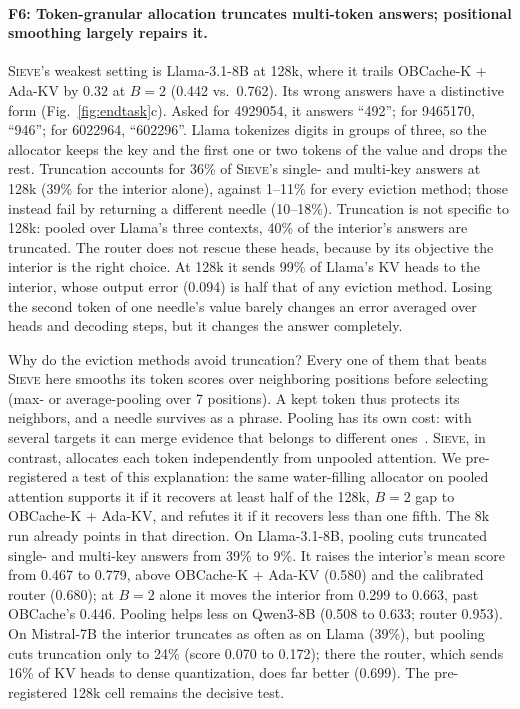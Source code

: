 \documentclass{article}
\newif\ifshowtbd \showtbdtrue
\newcommand{\tbd}[1]{\ifshowtbd{\color{tbdcol}\textbf{TBD}~#1}\else\ifhmode\unskip\fi\fi}
\newif\ifshowest \showesttrue
\DeclareRobustCommand{\est}[1]{\ifshowest{\color{estcol}#1}\else---\fi}
\DeclareRobustCommand{\estonly}[1]{\ifshowest#1\else\ifhmode\unskip\fi\fi}
\newcommand{\sieve}{\textsc{Sieve}}
\theoremstyle{definition}
\begin{document}
\paragraph{F6: Token-granular allocation truncates multi-token answers; positional smoothing largely repairs it.}
\sieve{}'s weakest setting is Llama-3.1-8B at 128k, where it trails OBCache-K + Ada-KV by $0.32$ at $B=2$ (0.442 vs.\ 0.762).  Its wrong answers have a distinctive form (Fig.~\ref{fig:endtask}c).  Asked for 4929054, it answers ``492''; for 9465170, ``946''; for 6022964, ``602296''.  Llama tokenizes digits in groups of three, so the allocator keeps the key and the first one or two tokens of the value and drops the rest.  Truncation accounts for 36\% of \sieve{}'s single- and multi-key answers at 128k (39\% for the interior alone), against 1--11\% for every eviction method; those instead fail by returning a different needle (10--18\%).  Truncation is not specific to 128k: pooled over Llama's three contexts, 40\% of the interior's answers are truncated.  The router does not rescue these heads, because by its objective the interior is the right choice.  At 128k it sends 99\% of Llama's KV heads to the interior, whose output error (0.094) is half that of any eviction method.  Losing the second token of one needle's value barely changes an error averaged over heads and decoding steps, but it changes the answer completely.

Why do the eviction methods avoid truncation?  Every one of them that beats \sieve{} here smooths its token scores over neighboring positions before selecting (max- or average-pooling over 7 positions).  A kept token thus protects its neighbors, and a needle survives as a phrase.  Pooling has its own cost: with several targets it can merge evidence that belongs to different ones~\citep{zhang2026fixedcontract}.  \sieve{}, in contrast, allocates each token independently from unpooled attention.  We pre-registered a test of this explanation: the same water-filling allocator on pooled attention supports it if it recovers at least half of the 128k, $B=2$ gap to OBCache-K + Ada-KV, and refutes it if it recovers less than one fifth.  The 8k run already points in that direction.  On Llama-3.1-8B, pooling cuts truncated single- and multi-key answers from 39\% to 9\%.  It raises the interior's mean score from 0.467 to 0.779, above OBCache-K + Ada-KV (0.580) and the calibrated router (0.680); at $B=2$ alone it moves the interior from 0.299 to 0.663, past OBCache's 0.446.  Pooling helps less on Qwen3-8B (0.508 to 0.633; router 0.953).  On Mistral-7B the interior truncates as often as on Llama (39\%), but pooling cuts truncation only to 24\% (score 0.070 to 0.172); there the router, which sends 16\% of KV heads to dense quantization, does far better (0.699).  The pre-registered 128k cell remains the decisive test.
\end{document}

